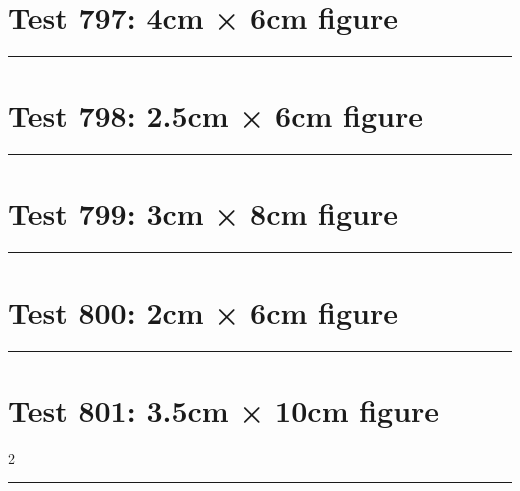 \documentclass[a4paper,11pt]{article}
\begin{document}
\section*{Test 797: 4cm × 6cm figure}
\begin{swarmwrap}%
  \begin{minipage}[t]{4cm}
    \centering
    \rule{\linewidth}{6cm}
  \end{minipage}%
\end{swarmwrap}%
\swarmwrapnext
\lipsum[97]
\lipsum[98]
\lipsum[99]
\lipsum[100]
\section*{Test 798: 2.5cm × 6cm figure}
\begin{swarmwrap}%
  \begin{minipage}[t]{2cm}
    \centering
    \rule{\linewidth}{6cm}
  \end{minipage}%
\end{swarmwrap}%
\swarmwrapnext
\lipsum[9]
\lipsum[10]
\lipsum[11]
\section*{Test 799: 3cm × 8cm figure}
\begin{swarmwrap}%
  \begin{minipage}[t]{3cm}
    \centering
    \rule{\linewidth}{8cm}
  \end{minipage}%
\end{swarmwrap}%
\swarmwrapnext
\lipsum[136]
\lipsum[137]
\lipsum[138]
\lipsum[139]
\lipsum[140]
\section*{Test 800: 2cm × 6cm figure}
\begin{swarmwrap}%
  \begin{minipage}[t]{2cm}
    \centering
    \rule{\linewidth}{6cm}
  \end{minipage}%
\end{swarmwrap}%
\swarmwrapnext
\lipsum[129]
\lipsum[130]
\lipsum[131]
\section*{Test 801: 3.5cm × 10cm figure}
\begin{multicols}{2}
  \begin{swarmwrap}%
    \begin{minipage}[t]{3cm}
      \centering
      \rule{\linewidth}{10cm}
    \end{minipage}%
  \end{swarmwrap}%
  \swarmwrapnext
  \lipsum[16]
  \lipsum[17]
  \lipsum[18]
  \lipsum[19]
  \lipsum[20]
\end{multicols}
\end{document}
